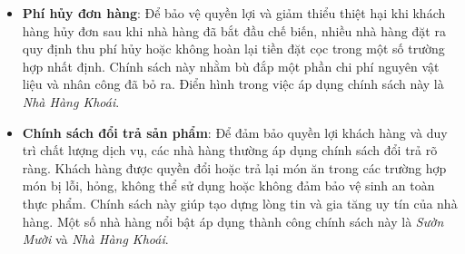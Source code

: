 \begin{itemize}
    \item \textbf{Phí hủy đơn hàng}: Để bảo vệ quyền lợi và giảm thiểu thiệt hại khi khách hàng hủy đơn sau khi nhà hàng đã bắt đầu chế biến, nhiều nhà hàng đặt ra quy định thu phí hủy hoặc không hoàn lại tiền đặt cọc trong một số trường hợp nhất định. Chính sách này nhằm bù đắp một phần chi phí nguyên vật liệu và nhân công đã bỏ ra. Điển hình trong việc áp dụng chính sách này là \textit{Nhà Hàng Khoái}.
    
    \item \textbf{Chính sách đổi trả sản phẩm}: Để đảm bảo quyền lợi khách hàng và duy trì chất lượng dịch vụ, các nhà hàng thường áp dụng chính sách đổi trả rõ ràng. Khách hàng được quyền đổi hoặc trả lại món ăn trong các trường hợp món bị lỗi, hỏng, không thể sử dụng hoặc không đảm bảo vệ sinh an toàn thực phẩm. Chính sách này giúp tạo dựng lòng tin và gia tăng uy tín của nhà hàng. Một số nhà hàng nổi bật áp dụng thành công chính sách này là \textit{Sườn Mười} và \textit{Nhà Hàng Khoái}.
    
\end{itemize}



